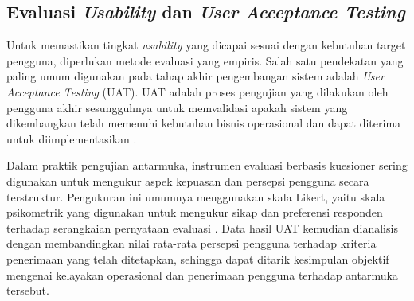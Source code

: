  

\subsection{Evaluasi \textit{Usability} dan \textit{User Acceptance Testing}}
\label{subsec:uat-teori}

Untuk memastikan tingkat \textit{usability} yang dicapai sesuai dengan kebutuhan target pengguna, diperlukan metode evaluasi yang empiris. Salah satu pendekatan yang paling umum digunakan pada tahap akhir pengembangan sistem adalah \textit{User Acceptance Testing} (UAT). UAT adalah proses pengujian yang dilakukan oleh pengguna akhir sesungguhnya untuk memvalidasi apakah sistem yang dikembangkan telah memenuhi kebutuhan bisnis operasional dan dapat diterima untuk diimplementasikan \cite{cimperman2006uat}.

Dalam praktik pengujian antarmuka, instrumen evaluasi berbasis kuesioner sering digunakan untuk mengukur aspek kepuasan dan persepsi pengguna secara terstruktur. Pengukuran ini umumnya menggunakan skala Likert, yaitu skala psikometrik yang digunakan untuk mengukur sikap dan preferensi responden terhadap serangkaian pernyataan evaluasi \cite{joshi2015likert}. Data hasil UAT kemudian dianalisis dengan membandingkan nilai rata-rata persepsi pengguna terhadap kriteria penerimaan yang telah ditetapkan, sehingga dapat ditarik kesimpulan objektif mengenai kelayakan operasional dan penerimaan pengguna terhadap antarmuka tersebut.
 
